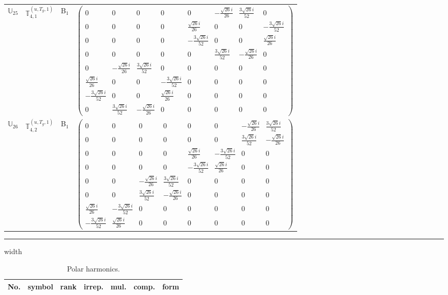 \documentclass[fleqn,10pt,landscape]{article}
\begin{document}
\begin{itemize}
\begin{center}
\begin{longtable}{c|c|c|c}
$ \mathbb{U}_{25} $ & $\mathbb{T}_{4,1}^{(u,T_{g},1)}$ & B$_{1}$ & $\begin{pmatrix} 0 & 0 & 0 & 0 & 0 & - \frac{\sqrt{26} i}{26} & \frac{3 \sqrt{26} i}{52} & 0 \\ 0 & 0 & 0 & 0 & \frac{\sqrt{26} i}{26} & 0 & 0 & - \frac{3 \sqrt{26} i}{52} \\ 0 & 0 & 0 & 0 & - \frac{3 \sqrt{26} i}{52} & 0 & 0 & \frac{\sqrt{26} i}{26} \\ 0 & 0 & 0 & 0 & 0 & \frac{3 \sqrt{26} i}{52} & - \frac{\sqrt{26} i}{26} & 0 \\ 0 & - \frac{\sqrt{26} i}{26} & \frac{3 \sqrt{26} i}{52} & 0 & 0 & 0 & 0 & 0 \\ \frac{\sqrt{26} i}{26} & 0 & 0 & - \frac{3 \sqrt{26} i}{52} & 0 & 0 & 0 & 0 \\ - \frac{3 \sqrt{26} i}{52} & 0 & 0 & \frac{\sqrt{26} i}{26} & 0 & 0 & 0 & 0 \\ 0 & \frac{3 \sqrt{26} i}{52} & - \frac{\sqrt{26} i}{26} & 0 & 0 & 0 & 0 & 0 \end{pmatrix}$ \\
$ \mathbb{U}_{26} $ & $\mathbb{T}_{4,2}^{(u,T_{g},1)}$ & B$_{1}$ & $\begin{pmatrix} 0 & 0 & 0 & 0 & 0 & 0 & - \frac{\sqrt{26} i}{26} & \frac{3 \sqrt{26} i}{52} \\ 0 & 0 & 0 & 0 & 0 & 0 & \frac{3 \sqrt{26} i}{52} & - \frac{\sqrt{26} i}{26} \\ 0 & 0 & 0 & 0 & \frac{\sqrt{26} i}{26} & - \frac{3 \sqrt{26} i}{52} & 0 & 0 \\ 0 & 0 & 0 & 0 & - \frac{3 \sqrt{26} i}{52} & \frac{\sqrt{26} i}{26} & 0 & 0 \\ 0 & 0 & - \frac{\sqrt{26} i}{26} & \frac{3 \sqrt{26} i}{52} & 0 & 0 & 0 & 0 \\ 0 & 0 & \frac{3 \sqrt{26} i}{52} & - \frac{\sqrt{26} i}{26} & 0 & 0 & 0 & 0 \\ \frac{\sqrt{26} i}{26} & - \frac{3 \sqrt{26} i}{52} & 0 & 0 & 0 & 0 & 0 & 0 \\ - \frac{3 \sqrt{26} i}{52} & \frac{\sqrt{26} i}{26} & 0 & 0 & 0 & 0 & 0 & 0 \end{pmatrix}$ \\
\end{longtable}
\end{center}

 \hfil \hrule height 1mm width \textwidth \hfil

\begin{center}
\renewcommand{\arraystretch}{1.3}
\begin{longtable}{ccccccc}
\caption{Polar harmonics.}
 \\
 \hline \hline
No. & symbol & rank & irrep. & mul. & comp. & form \\ \hline \endfirsthead


\end{longtable}
\end{center}
\end{itemize}
\end{document}
